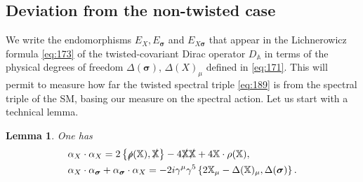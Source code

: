 \documentclass[11pt]{article}
\newcommand{\sig}{{\boldsymbol{\sigma}}}
\newcommand{\XX}{{\mathbb X}}
\newtheorem{lemma}[prop]{Lemma}
\begin{document}
\subsection{Deviation from the non-twisted case}
\label{deviation}

We write the endomorphisms $E_X, E_\sig$ and
$E_{X\sig}$ that appear in the Lichnerowicz formula \eqref{eq:173} of the
twisted-covariant Dirac operator $D_{\mathbb A}$ in
terms of the physical degrees of freedom $\Delta(\sig)$,
$\Delta(X)_\mu$ defined in \eqref{eq:171}. This will permit to measure how far the twisted
spectral triple \eqref{eq:189} is from the spectral
triple of the SM, basing our measure on the spectral
action. Let us start with a technical lemma.\begin{lemma} 
\label{lemmabreaking}
One has
  \begin{align}
\label{alphaxalphax}
&\alpha_X\cdot\alpha_X = 2\left\{\slashed\rho(\XX), \slashed\XX\right\} - 4 \slashed \XX \slashed\XX  
+ 4\XX\cdot\rho(\XX),\\
\label{alphaxalphasig}
&\alpha_X\cdot\alpha_{\sig}+  \alpha_{\sig}\cdot\alpha_{X} = -2i\gamma^\mu \gamma^5\left\{2\XX_\mu  -\Delta(\XX)_\mu, \Delta(\sig) \right\}.
\end{align}
\end{lemma}
\end{document}
